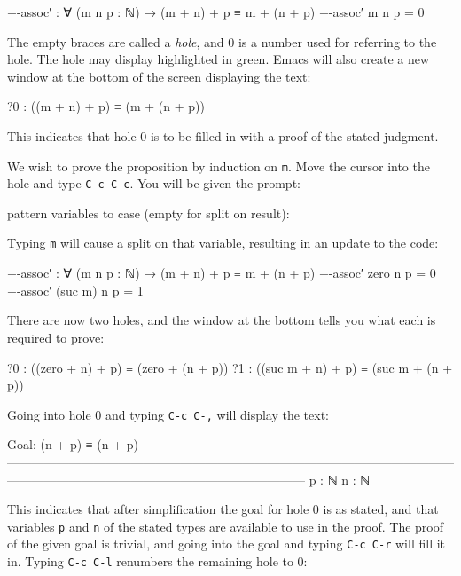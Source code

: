 \begin{myDisplay}
+-assoc′ : ∀ (m n p : ℕ) → (m + n) + p ≡ m + (n + p)
+-assoc′ m n p = { }0
\end{myDisplay}

The empty braces are called a \emph{hole}, and 0 is a number used for
referring to the hole. The hole may display highlighted in green. Emacs
will also create a new window at the bottom of the screen displaying the
text:

\begin{myDisplay}
?0 : ((m + n) + p) ≡ (m + (n + p))
\end{myDisplay}

This indicates that hole 0 is to be filled in with a proof of the stated
judgment.

We wish to prove the proposition by induction on \texttt{m}. Move the
cursor into the hole and type \texttt{C-c\ C-c}. You will be given the
prompt:

\begin{myDisplay}
pattern variables to case (empty for split on result):
\end{myDisplay}

Typing \texttt{m} will cause a split on that variable, resulting in an
update to the code:

\begin{myDisplay}
+-assoc′ : ∀ (m n p : ℕ) → (m + n) + p ≡ m + (n + p)
+-assoc′ zero n p = { }0
+-assoc′ (suc m) n p = { }1
\end{myDisplay}

There are now two holes, and the window at the bottom tells you what
each is required to prove:

\begin{myDisplay}
?0 : ((zero + n) + p) ≡ (zero + (n + p))
?1 : ((suc m + n) + p) ≡ (suc m + (n + p))
\end{myDisplay}

Going into hole 0 and typing \texttt{C-c\ C-,} will display the text:

\begin{myDisplay}
Goal: (n + p) ≡ (n + p)
————————————————————————————————————————————————————————————
p : ℕ
n : ℕ
\end{myDisplay}

This indicates that after simplification the goal for hole 0 is as
stated, and that variables \texttt{p} and \texttt{n} of the stated types
are available to use in the proof. The proof of the given goal is
trivial, and going into the goal and typing \texttt{C-c\ C-r} will fill
it in. Typing \texttt{C-c\ C-l} renumbers the remaining hole to 0:

